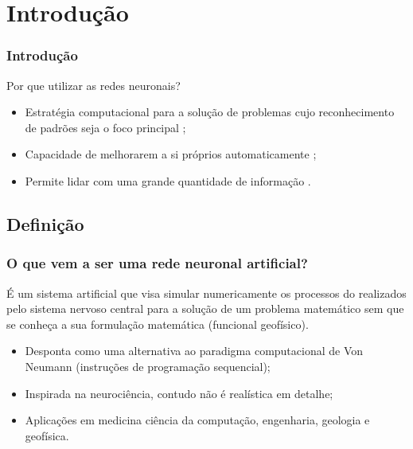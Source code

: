 \documentclass[aspectratio=10]{beamer} %
\begin{document}
\section{Introdução}
\begin{frame}
\frametitle{Introdução}
\transboxin%
\begin{block}{Por que utilizar as redes neuronais?}
	\begin{itemize}
		\pause
		\item Estratégia computacional para a solução de problemas cujo reconhecimento de padrões seja o foco principal \citep{MacKay2005};
		\pause
		\item Capacidade de melhorarem a si próprios automaticamente \citep{Michie1994,Levy1997};
		\pause
		\item Permite lidar com uma grande quantidade de informação \citep{Mao1996,Hall2014}.
	\end{itemize}	
\end{block}

\end{frame}
\subsection{Definição}
\begin{frame}
\frametitle{O que vem a ser uma rede neuronal artificial?}
\pause
\color{blue} É um sistema artificial que visa simular numericamente os processos do realizados pelo sistema nervoso central para a solução de um problema matemático sem que se conheça a sua formulação matemática (funcional geofísico). 
\pause
\begin{itemize}
\item Desponta como uma alternativa ao paradigma computacional de Von Neumann (instruções de programação sequencial);
\pause
\item Inspirada na neurociência, contudo não é realística em detalhe;
\pause
\item Aplicações em medicina ciência da computação, engenharia, geologia e geofísica. 
\end{itemize}
\end{frame}
\end{document}
